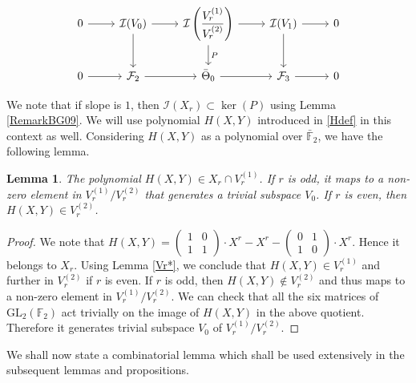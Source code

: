 \documentclass[11pt, reqno]{amsart}
\numberwithin{equation}{section}
\newcommand\sF{{\mathcal{F}}}
\newcommand\GL{{\mathrm{GL}}}
\newcommand{\F}{\mathbb{F}}
\newtheorem{lemma}[thm]{Lemma}
\theoremstyle{definition}
\theoremstyle{remark}
\theoremstyle{definition}
\theoremstyle{remark}
\theoremstyle{remark}
\begin{document}
\begin{equation}\label{diag3}
\begin{tikzcd}
	0 \arrow[r] & \mathcal{I} (V_0) \arrow[d, " "]\arrow[r] & \mathcal{I}\left(\dfrac{V_{r}^{(1)}}{V_{r}^{(2)}}\right)  \arrow[r] \arrow[d, "P"] & \mathcal{I} (V_1) \arrow [r] \arrow[d, " "]& 0\\
	0 \arrow[r] & \sF_2 \arrow[r] & \bar{\Theta}_0\arrow[r] & \sF_3\arrow[r] & 0
\end{tikzcd}
\end{equation}

We note that if slope is $1$, then $\mathcal{I}\left(X_{r}\right)\subset \ker(P)$ using Lemma \ref{RemarkBG09}. We will use polynomial $H(X,Y)$ introduced in \eqref{Hdef} in this context as well. Considering $H(X,Y)$ as a polynomial over $\bar{\F}_{2}$, we have the following lemma.
\begin{lemma}\label{X_r^*}
    The polynomial $H(X,Y)\in X_r\cap V_r^{(1)}$. If $r$ is odd, it maps to a non-zero element in $V_r^{(1)}/V_r^{(2)}$ that generates a trivial subspace $V_0$. If $r$ is even, then $H(X,Y)\in V_r^{(2)}$. 
\end{lemma}
\begin{proof}
We note that $H(X,Y) = \begin{pmatrix}
	1 & 0\\
	1 & 1
\end{pmatrix} \cdot X^{r}- X^{r}-\begin{pmatrix}
	0 & 1\\
	1 & 0
\end{pmatrix} \cdot X^{r}$. Hence it belongs to $X_{r}$. Using Lemma \ref{Vr*}, we conclude that $H(X,Y)\in  V_r^{(1)}$ and further in $V_{r}^{(2)}$ if $r$ is even.  If $r$ is odd, then $H(X,Y)\notin V_{r}^{(2)}$ and thus maps to a non-zero element in $V_{r}^{(1)}/V_{r}^{(2)}$. We can check that all the six matrices of $\GL_{2}(\mathbb{F}_{2})$ act trivially on the image of $H(X,Y)$ in the above quotient. Therefore it generates trivial subspace $V_{0}$ of $V_r^{(1)}/V_r^{(2)}$.  \end{proof}

We shall now state a combinatorial lemma which shall be used extensively in the subsequent lemmas and propositions.
\end{document}
